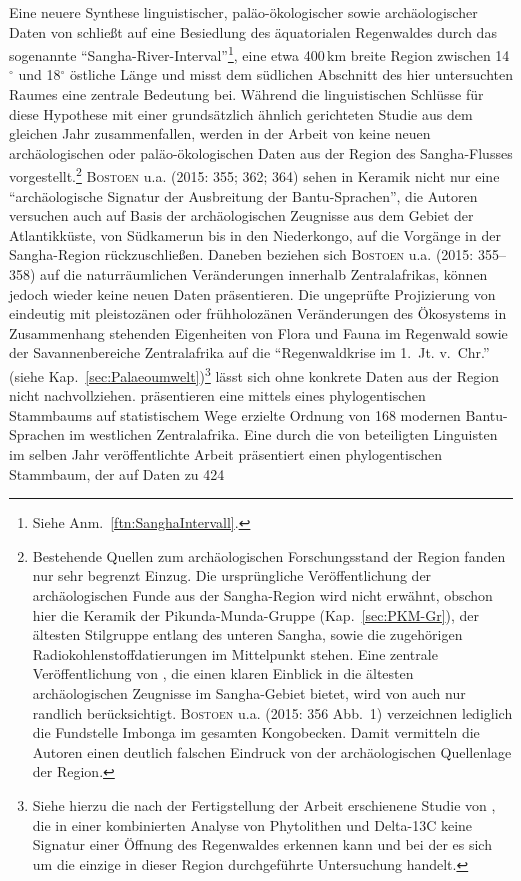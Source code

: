 \begin{multicols}{2}
Eine neuere Synthese linguistischer, paläo-ökologischer sowie archäologischer Daten von \textcite{Bostoen.2015} schließt auf eine Besiedlung des äquatorialen Regenwaldes durch das sogenannte \enquote{\mbox{Sangha}-River-Interval}\footnote{Siehe Anm.~\ref{ftn:SanghaIntervall}.}, eine etwa 400\,km breite Region zwischen 14$^\circ$ und 18$^\circ$ östliche Länge und misst dem südlichen Abschnitt des hier untersuchten Raumes eine zentrale Bedeutung bei. Während die linguistischen Schlüsse für diese Hypothese mit einer grundsätzlich ähnlich gerichteten Studie aus dem gleichen Jahr \parencite{Grollemund.2015} zusammenfallen, werden in der Arbeit von \textcite{Bostoen.2015} keine neuen archäologischen oder paläo-ökologischen Daten aus der Region des \mbox{Sangha}-Flusses vorgestellt.\footnote{Bestehende Quellen zum archäologischen Forschungsstand der Region fanden nur sehr begrenzt Einzug. Die ursprüngliche Veröffentlichung der archäologischen Funde aus der \mbox{Sangha}-Region \parencite{Eggert.1992} wird nicht erwähnt, obschon hier die Keramik der Pikunda-Munda-Gruppe (Kap.~\ref{sec:PKM-Gr}), der ältesten Stilgruppe entlang des unteren \mbox{Sangha}, sowie die zugehörigen Radiokohlenstoffdatierungen im Mittelpunkt stehen. Eine zentrale Veröffentlichung von \textcite{Eggert.1993}, die einen klaren Einblick in die ältesten archäologischen Zeugnisse im \mbox{Sangha}-Gebiet bietet, wird von \textcite{Bostoen.2015} auch nur randlich berücksichtigt. \textsc{Bostoen} u.a. (2015: 356 Abb.~1) verzeichnen lediglich die Fundstelle Imbonga im gesamten Kongobecken. Damit vermitteln die Autoren einen deutlich falschen Eindruck von der archäologischen Quellenlage der Region.} \textsc{Bostoen} u.a. (2015: 355; 362; 364) sehen in Keramik nicht nur eine \enquote{archäologische Signatur der Ausbreitung der Bantu-Sprachen}, die Autoren versuchen auch auf Basis der archäologischen Zeugnisse aus dem Gebiet der Atlantikküste, von Südkamerun bis in den Niederkongo, auf die Vorgänge in der \mbox{Sangha}-Region rückzuschließen. Daneben beziehen sich \textsc{Bostoen} u.a. (2015: 355--358) auf die naturräumlichen Veränderungen innerhalb Zentralafrikas, können jedoch wieder keine neuen Daten präsentieren. Die ungeprüfte Projizierung von eindeutig mit pleistozänen oder frühholozänen Veränderungen des Ökosystems in Zusammenhang stehenden Eigenheiten von Flora und Fauna im Regenwald sowie der Savannenbereiche Zentralafrika auf die \enquote{Regenwaldkrise im 1.~Jt. v.~Chr.} (siehe Kap.~\ref{sec:Palaeoumwelt})\footnote{Siehe hierzu die nach der Fertigstellung der Arbeit erschienene Studie von \textcite{Bremond.2017}, die in einer kombinierten Analyse von Phytolithen und Delta-13C keine Signatur einer Öffnung des Regenwaldes erkennen kann und bei der es sich um die einzige in dieser Region durchgeführte Untersuchung handelt.\label{ftn:Bremond2017}} lässt sich ohne konkrete Daten aus der Region nicht nachvollziehen. \textcite{Bostoen.2015} präsentieren eine mittels eines phylogentischen Stammbaums auf statistischem Wege erzielte Ordnung von 168 modernen Bantu-Sprachen im westlichen Zentralafrika. Eine durch die von \textcite{Bostoen.2015} beteiligten Linguisten im selben Jahr veröffentlichte Arbeit \parencite{Grollemund.2015} präsentiert einen phylogentischen Stammbaum, der auf Daten zu 424 
\end{multicols}
